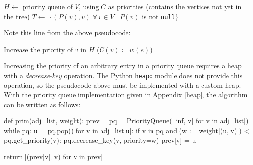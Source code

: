\documentclass[12pt, titlepage]{article}
\begin{document}
\begin{algorithm}[H]
  \SetAlgoLined
  \DontPrintSemicolon
  $H \longleftarrow$\hspace{0.5mm} priority queue of $V$, using $C$ as priorities\;
  \hspace{13mm}(contains the vertices not yet in the tree)\;
  $T \longleftarrow$\hspace{0.5mm} \{$(P(v), v)\;\forall\,v\in V\mid P(v)$ is not \texttt{null}\}\;
  \;
  \caption{Prim's Algorithm (heap with \textit{decrease-key})}
\end{algorithm} \medskip

Note this line from the above pseudocode:
\begin{center}
Increase the priority of $v$ in $H$\hspace{4mm} ($C(v)\coloneqq w(e)$)
\end{center}
Increasing the priority of an arbitrary entry in a priority queue requires a heap with a \textit{decrease-key} operation. The Python \texttt{heapq} module does not provide this operation, so the pseudocode above must be implemented with a custom heap. With the priority queue implementation given in Appendix \ref{heap}, the algorithm can be written as follows: \medskip

\begin{python}
def prim(adj_list, weight):
    prev = {}
    pq = PriorityQueue([[inf, v] for v in adj_list])
    while pq:
        u = pq.pop()
        for v in adj_list[u]:
            if v in pq and (w := weight[(u, v)]) < pq.get_priority(v):
                pq.decrease_key(v, priority=w)
                prev[v] = u

    return [(prev[v], v) for v in prev]
\end{python}
\end{document}
